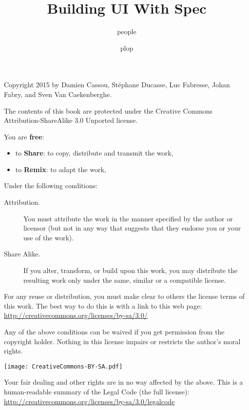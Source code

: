 \documentclass[10pt,twoside,english,showtrims]{support/latex/sbabook/sbabook}
\title{Building UI With Spec}
\author{people}
\date{plop}
\begin{document}
\maketitle
\pagestyle{titlingpage}
\thispagestyle{titlingpage} %

\cleartoverso
{\small

  Copyright 2015 by Damien Cassou, Stéphane Ducasse, Luc Fabresse, Johan Fabry,
  and Sven Van Caekenberghe.

  The contents of this book are protected under the Creative Commons
  Attribution-ShareAlike 3.0 Unported license.

  You are \textbf{free}:
  \begin{itemize}
  \item to \textbf{Share}: to copy, distribute and transmit the work,
  \item to \textbf{Remix}: to adapt the work,
  \end{itemize}

  Under the following conditions:
  \begin{description}
  \item[Attribution.] You must attribute the work in the manner specified by the
    author or licensor (but not in any way that suggests that they endorse you
    or your use of the work).
  \item[Share Alike.] If you alter, transform, or build upon this work, you may
    distribute the resulting work only under the same, similar or a compatible
    license.
  \end{description}

  For any reuse or distribution, you must make clear to others the
  license terms of this work. The best way to do this is with a link to
  this web page: \\
  \url{http://creativecommons.org/licenses/by-sa/3.0/}

  Any of the above conditions can be waived if you get permission from
  the copyright holder. Nothing in this license impairs or restricts the
  author's moral rights.

  \begin{center}
    \texttt{[image: CreativeCommons-BY-SA.pdf]}
  \end{center}

  Your fair dealing and other rights are in no way affected by the
  above. This is a human-readable summary of the Legal Code (the full
  license): \\
  \url{http://creativecommons.org/licenses/by-sa/3.0/legalcode}

}
\end{document}
